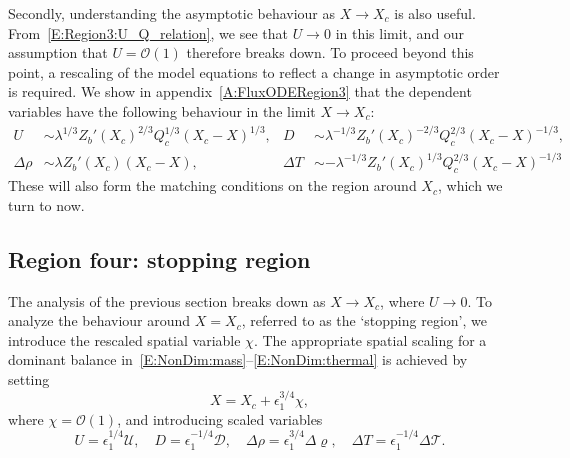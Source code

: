 \documentclass[openacc]{rsproca_new}%
\newcommand{\order}[1]{\mathcal{O}(#1)}
\newcommand{\red}[1]{{\color{red} #1}}
\newcommand{\epsone}{\epsilon_{1}} %
\begin{document}
Secondly, understanding the asymptotic behaviour as $X \to X_c$ is also useful. From~\eqref{E:Region3:U_Q_relation}, we see that $U \to 0$ in this limit, and our assumption that $U = \order{1}$ therefore breaks down. To proceed beyond this point, a rescaling of the model equations to reflect a change in asymptotic order is required. \red{We show in appendix~\ref{A:FluxODERegion3}} that the dependent variables have the following behaviour in the limit $X \to X_c$:
\begin{align}
U &\sim \lambda^{1/3} Z_b'(X_c)^{2/3} Q_c^{1/3}(X_c - X)^{1/3}, & D &\sim \lambda^{-1/3} Z_b'(X_c)^{-2/3} Q_c^{2/3}(X_c - X)^{-1/3},\label{E:Region3:X_to_Xc1}\\
\Delta \rho &\sim  \lambda Z_b'(X_c) (X_c - X), & \Delta T &\sim -\lambda^{-1/3} Z_b'(X_c)^{1/3} Q_c^{2/3}(X_c - X)^{-1/3}\label{E:Region3:X_to_Xc2}
\end{align}
These will also form the matching conditions on the region around $X_c$, which we turn to now.



\subsection{Region four: stopping region}\label{S:Asymptotics:Region4}
\newcommand{\U}{\mathcal{U}}
\newcommand{\D}{\mathcal{D}}
\newcommand{\p}{\Delta \varrho}
\renewcommand{\t}{\Delta \mathcal{T}}

The analysis of the previous section breaks down as $X \to X_c$, where $U \to 0$. To analyze the behaviour around $X = X_c$, referred to as the `stopping region', we introduce the rescaled spatial variable $\chi$. The appropriate spatial scaling for a dominant balance in~\eqref{E:NonDim:mass}--\eqref{E:NonDim:thermal} is achieved by setting 
\begin{equation}\label{E:Region4:X_scaling}
X = X_c + \epsone^{3/4}\chi,
\end{equation}
where $\chi = \order{1}$, and introducing scaled variables
\begin{equation}\label{E:Region4:var_scaling}
U = \epsone^{1/4}\U, \quad D = \epsone^{-1/4}\D, \quad \Delta \rho = \epsone^{3/4}\p, \quad  \Delta T = \epsone^{-1/4} \t.
\end{equation}
\end{document}

